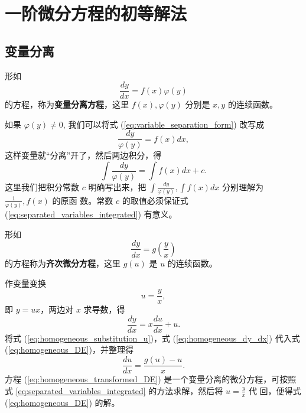 \chapter{一阶微分方程的初等解法}\label{chap:一阶微分方程的初等解法}
\section{变量分离}\label{sec:变量分离}
\begin{definition}[变量分离方程]\label{def:变量分离方程}
    形如
\begin{equation}
\frac{dy}{dx} = f(x)\varphi(y) \label{eq:variable_separation_form}
\end{equation}
的方程，称为\textbf{变量分离方程}，这里 $f(x), \varphi(y)$ 分别是 $x,y$ 的连续函数。
\end{definition}

\begin{solution}
    如果 $\varphi(y) \ne 0$, 我们可以将式 (\ref{eq:variable_separation_form}) 改写成
$$\frac{dy}{\varphi(y)} = f(x) dx,$$
这样变量就“分离”开了，然后两边积分，得
\begin{equation}
\int \frac{dy}{\varphi(y)} = \int f(x) dx + c. \label{eq:separated_variables_integrated}
\end{equation}
这里我们把积分常数 $c$ 明确写出来，把 $\int \frac{dy}{\varphi(y)}, \int f(x) dx$ 分别理解为 $\frac{1}{\varphi(y)}, f(x)$ 的原函
数。常数 $c$ 的取值必须保证式 (\ref{eq:separated_variables_integrated}) 有意义。
\end{solution}

\begin{definition}[齐次微分方程]\label{def:齐次微分方程}
    形如
\begin{equation}
\frac{dy}{dx} = g\left(\frac{y}{x}\right) \label{eq:homogeneous_DE}
\end{equation}
的方程称为\textbf{齐次微分方程}，这里 $g(u)$ 是 $u$ 的连续函数。

\end{definition}
\begin{solution}
    作变量变换
\begin{equation}
u = \frac{y}{x}, \label{eq:homogeneous_substitution_u}
\end{equation}
即 $y=ux$，两边对 $x$ 求导数，得
\begin{equation}
\frac{dy}{dx} = x\frac{du}{dx} + u. \label{eq:homogeneous_dy_dx}
\end{equation}
将式 (\ref{eq:homogeneous_substitution_u})，式 (\ref{eq:homogeneous_dy_dx}) 代入式 (\ref{eq:homogeneous_DE})，并整理得
\begin{equation}
\frac{du}{dx} = \frac{g(u)-u}{x}. \label{eq:homogeneous_transformed_DE}
\end{equation}
方程 (\ref{eq:homogeneous_transformed_DE}) 是一个变量分离的微分方程，可按照式 \eqref{eq:separated_variables_integrated} 的方法求解，然后将 $u=\frac{y}{x}$ 代
回，便得式 (\ref{eq:homogeneous_DE}) 的解。
\end{solution}

